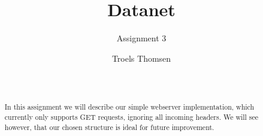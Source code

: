 \documentclass{acm_proc_article-sp}
\begin{document}
\title{Datanet}
\subtitle{Assignment 3}

%
%
%
%


\author{
%
%
\alignauthor
Troels Thomsen\\
       \\
       \\
}

\maketitle

\begin{abstract}
In this assignment we will describe our simple webserver implementation, which currently only supports GET requests, ignoring all incoming headers.
We will see however, that our chosen structure is ideal for future improvement.
\end{abstract}
\end{document}
